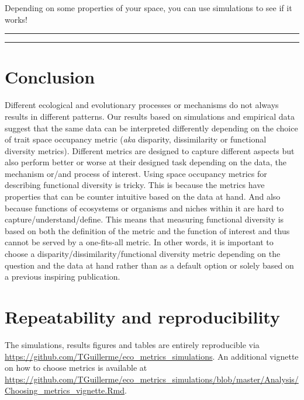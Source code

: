 \documentclass[12pt,letterpaper]{article}
\begin{document}
Depending on some properties of your space, you can use simulations to see if it works!



\bigskip
\bigskip
\hrule
\hrule

\section{Conclusion}
Different ecological and evolutionary processes or mechanisms do not always results in different patterns.
Our results based on simulations and empirical data suggest that the same data can be interpreted differently depending on the choice of trait space occupancy metric (\textit{aka} disparity, dissimilarity or functional diversity metrics).
Different metrics are designed to capture different aspects \citep{guillerme2020shifting,mammola2021concepts} but also perform better or worse at their designed task depending on the data, the mechanism or/and process of interest.
Using space occupancy metrics for describing functional diversity is tricky.
This is because the metrics have properties that can be counter intuitive based on the data at hand.
And also because functions of ecosystems or organisms and niches within it are hard to capture/understand/define.
This means that measuring functional diversity is based on both the definition of the metric and the function of interest and thus cannot be served by a one-fits-all metric.
In other words, it is important to choose a disparity/dissimilarity/functional diversity metric depending on the question and the data at hand rather than as a default option or solely based on a previous inspiring publication.


\section{Repeatability and reproducibility}
The simulations, results figures and tables are entirely reproducible via \url{https://github.com/TGuillerme/eco_metrics_simulations}.
An additional vignette on how to choose metrics is available at \url{https://github.com/TGuillerme/eco_metrics_simulations/blob/master/Analysis/Choosing_metrics_vignette.Rmd}.







\end{document}
